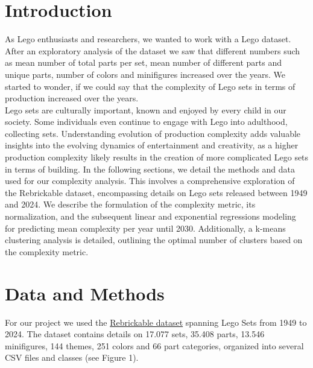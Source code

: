 \documentclass{article}
\theoremstyle{plain}
\theoremstyle{definition}
\theoremstyle{remark}
\begin{document}
\section{Introduction}\label{sec:intro}
As Lego enthusiasts and researchers, we wanted to work with a Lego dataset. After an exploratory analysis of the dataset we saw that different numbers such as mean number of total parts per set, mean number of different parts and unique parts, number of colors and minifigures increased over the years. We started to wonder, if we could say that the complexity of Lego sets in terms of production increased over the years. \\
Lego sets are culturally important, known and enjoyed by every child in our society. Some individuals even continue to engage with Lego into adulthood, collecting sets. Understanding evolution of production complexity adds valuable insights into the evolving dynamics of entertainment and creativity, as a higher production complexity likely results in the creation of more complicated Lego sets in terms of building.
In the following sections, we detail the methods and data used for our complexity analysis. This involves a comprehensive exploration of the Rebrickable dataset, encompassing details on Lego sets released between 1949 and 2024. We describe the formulation of the complexity metric, its normalization, and the subsequent linear and exponential regressions modeling for predicting mean complexity per year until 2030. Additionally, a k-means clustering analysis is detailed, outlining the optimal number of clusters based on the complexity metric.


\section{Data and Methods}\label{sec:methods}

For our project we used the \href{https://rebrickable.com/downloads/}{Rebrickable dataset} spanning Lego Sets from 1949 to 2024. The dataset contains details on 17.077 sets, 35.408 parts, 13.546 minifigures, 144 themes, 251 colors and 66 part categories, organized into several CSV files and classes (see Figure 1).
\end{document}
